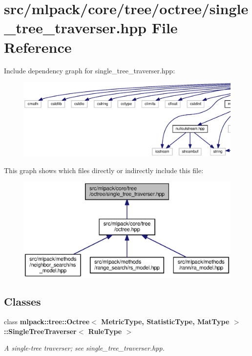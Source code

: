 \section{src/mlpack/core/tree/octree/single\+\_\+tree\+\_\+traverser.hpp File Reference}
\label{octree_2single__tree__traverser_8hpp}
Include dependency graph for single\+\_\+tree\+\_\+traverser.\+hpp\+:
\nopagebreak
\begin{figure}[H]
\begin{center}
\leavevmode
\includegraphics[width=350pt]{octree_2single__tree__traverser_8hpp__incl}
\end{center}
\end{figure}
This graph shows which files directly or indirectly include this file\+:
\nopagebreak
\begin{figure}[H]
\begin{center}
\leavevmode
\includegraphics[width=350pt]{octree_2single__tree__traverser_8hpp__dep__incl}
\end{center}
\end{figure}
\subsection*{Classes}
\begin{DoxyCompactItemize}
\item 
class {\bf mlpack\+::tree\+::\+Octree$<$ Metric\+Type, Statistic\+Type, Mat\+Type $>$\+::\+Single\+Tree\+Traverser$<$ Rule\+Type $>$}
\begin{DoxyCompactList}\small\item\em A single-\/tree traverser; see single\+\_\+tree\+\_\+traverser.\+hpp. \end{DoxyCompactList}\end{DoxyCompactItemize}
